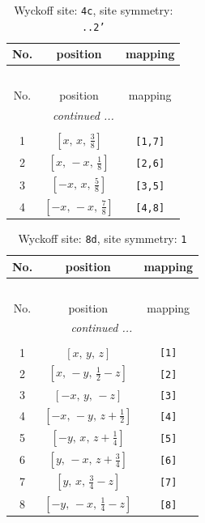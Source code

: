 \documentclass[fleqn,8pt]{jsarticle}
\begin{document}
\renewcommand{\arraystretch}{1.2}
\begin{longtable}{ccc}
\caption{Wyckoff site: {\tt 4c}, site symmetry: {\tt ..2'}}
 \\
 \hline \hline
No. & position & mapping \\ \hline \endfirsthead

\multicolumn{2}{l}{\tablename\ \thetable{}} \\
 \hline \hline
No. & position & mapping \\ \hline \endhead

 \hline \hline
\multicolumn{2}{r}{\footnotesize\it continued ...} \\ \endfoot

 \hline \hline
\multicolumn{2}{r}{} \\ \endlastfoot

1 & $\left[ x,\, x,\, \frac{3}{8} \right]$ & {\tt [1,7]} \\ \hline
2 & $\left[ x,\, - x,\, \frac{1}{8} \right]$ & {\tt [2,6]} \\ \hline
3 & $\left[ - x,\, x,\, \frac{5}{8} \right]$ & {\tt [3,5]} \\ \hline
4 & $\left[ - x,\, - x,\, \frac{7}{8} \right]$ & {\tt [4,8]} \\
\end{longtable}
\renewcommand{\arraystretch}{1.2}
\begin{longtable}{ccc}
\caption{Wyckoff site: {\tt 8d}, site symmetry: {\tt 1}}
 \\
 \hline \hline
No. & position & mapping \\ \hline \endfirsthead

\multicolumn{2}{l}{\tablename\ \thetable{}} \\
 \hline \hline
No. & position & mapping \\ \hline \endhead

 \hline \hline
\multicolumn{2}{r}{\footnotesize\it continued ...} \\ \endfoot

 \hline \hline
\multicolumn{2}{r}{} \\ \endlastfoot

1 & $\left[ x,\, y,\, z \right]$ & {\tt [1]} \\ \hline
2 & $\left[ x,\, - y,\, \frac{1}{2} - z \right]$ & {\tt [2]} \\ \hline
3 & $\left[ - x,\, y,\, - z \right]$ & {\tt [3]} \\ \hline
4 & $\left[ - x,\, - y,\, z + \frac{1}{2} \right]$ & {\tt [4]} \\ \hline
5 & $\left[ - y,\, x,\, z + \frac{1}{4} \right]$ & {\tt [5]} \\ \hline
6 & $\left[ y,\, - x,\, z + \frac{3}{4} \right]$ & {\tt [6]} \\ \hline
7 & $\left[ y,\, x,\, \frac{3}{4} - z \right]$ & {\tt [7]} \\ \hline
8 & $\left[ - y,\, - x,\, \frac{1}{4} - z \right]$ & {\tt [8]} \\
\end{longtable}
\end{document}

